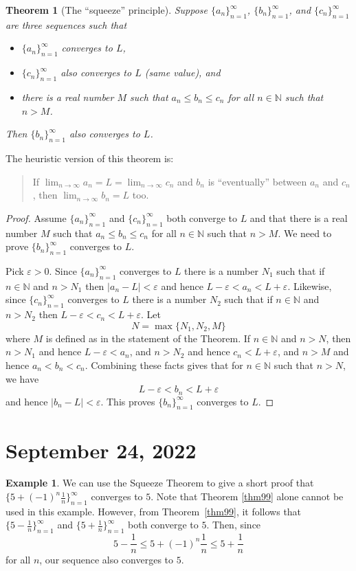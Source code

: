 \documentclass[12pt]{amsart}
\def\e{\varepsilon}
\newcommand{\N}{\mathbb{N}}
\numberwithin{equation}{section}
\theoremstyle{plain} %
\newtheorem{thm}[equation]{Theorem}
\newcommand{\Sept}[1]{\section{September #1, 2022}}
\theoremstyle{definition}
\newtheorem{ex}[equation]{Example}
\theoremstyle{remark}
\begin{document}
\begin{thm}[The ``squeeze'' principle] \label{thm33}
Suppose 
$\{a_n\}_{n=1}^\infty$, $\{b_n\}_{n=1}^\infty$, and $\{c_n\}_{n=1}^\infty$ are three sequences such that 
\begin{itemize}
\item $\{a_n\}_{n=1}^\infty$ converges to $L$, 
\item $\{c_n\}_{n=1}^\infty$ also converges to $L$ (same value), and
\item there is a real number $M$ such that $a_n \leq b_n \leq c_n$ for all $n \in \N$ such that $n > M$. 
\end{itemize}
Then $\{b_n\}_{n=1}^\infty$ also converges to $L$.
\end{thm}

The heuristic version of this theorem is:
\begin{quote}
If $\lim_{n \to \infty} a_n = L = \lim_{n \to \infty} c_n$ and $b_n$ is ``eventually'' between $a_n$ and $c_n$, then
$\lim_{n \to \infty} b_n = L$ too.
\end{quote}
 



\begin{proof}
Assume $\{a_n\}_{n=1}^\infty$ and  $\{c_n\}_{n=1}^\infty$ both
converge to $L$ and that there is a real number $M$ such that $a_n \leq b_n \leq c_n$ for all $n \in \N$ such that $n > M$. 
We need to prove $\{b_n\}_{n=1}^\infty$ converges to $L$.

Pick $\e> 0$.  Since  $\{a_n\}_{n=1}^\infty$ converges to $L$ there is a number $N_1$ such that if $n \in \N$ and $n > N_1$ then
$|a_n - L| < \e$ and hence $L- \e < a_n < L + \e$. Likewise, 
since $\{c_n\}_{n=1}^\infty$ converges to $L$ there is a number $N_2$ such that if $n \in \N$ and $n > N_2$ then
 $L- \e < c_n < L + \e$. Let 
$$
N = \max\{N_1, N_2, M\}
$$
where $M$ is defined as in the statement of the Theorem. If $n \in \N$ and $n > N$, then
$n > N_1$ and hence $L - \e < a_n$, and $n > N_2$ and hence $c_n < L + \e$, and $n > M$ and hence
$a_n < b_n < c_n$. Combining these facts gives that for $n \in \N$ such that $n > N$,
we have
$$
L - \e < b_n < L + \e
$$
and hence $|b_n - L| < \e$.
This proves $\{b_n\}_{n=1}^\infty$ converges to $L$. 
\end{proof}


\Sept{24}

\begin{ex} We can use the Squeeze Theorem to give a short proof that $\{ 5 + (-1)^n \frac{1}{n} \}_{n=1}^\infty$ converges to $5$. Note that Theorem \ref{thm99} alone cannot be used in this
  example. However, from Theorem~\ref{thm99}, it follows that $\{5-\frac{1}{n}\}_{n=1}^\infty$ and  $\{5+\frac{1}{n}\}_{n=1}^\infty$ both converge to $5$. Then, since \[5-\frac{1}{n} \leq  5 + (-1)^n \frac{1}{n} \leq 5+\frac{1}{n}\] for all $n$, our sequence also converges to $5$.\end{ex}
\end{document}
